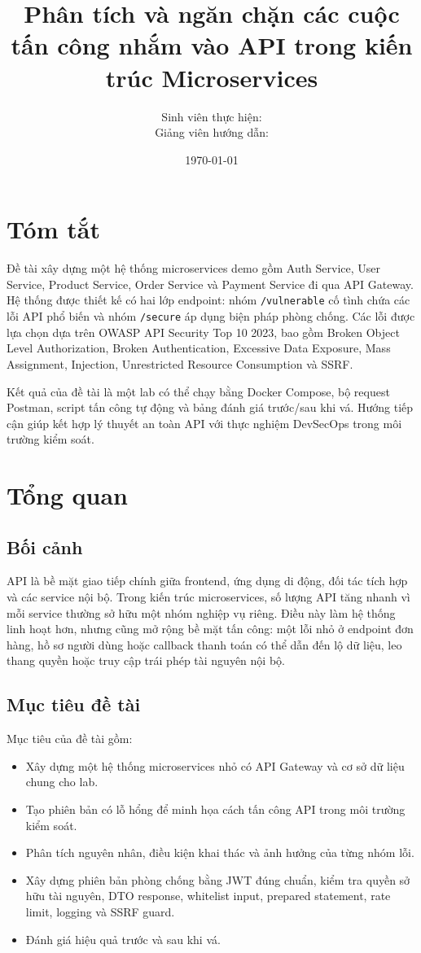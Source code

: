 \documentclass[12pt,a4paper]{report}
\title{\textbf{Phân tích và ngăn chặn các cuộc tấn công nhắm vào API trong kiến trúc Microservices}}
\author{Sinh viên thực hiện: \underline{\hspace{6cm}}\\Giảng viên hướng dẫn: \underline{\hspace{5.4cm}}}
\date{\today}
\begin{document}
\maketitle
\tableofcontents
\newpage

\chapter*{Tóm tắt}
Đề tài xây dựng một hệ thống microservices demo gồm Auth Service, User Service, Product Service, Order Service và Payment Service đi qua API Gateway. Hệ thống được thiết kế có hai lớp endpoint: nhóm \texttt{/vulnerable} cố tình chứa các lỗi API phổ biến và nhóm \texttt{/secure} áp dụng biện pháp phòng chống. Các lỗi được lựa chọn dựa trên OWASP API Security Top 10 2023, bao gồm Broken Object Level Authorization, Broken Authentication, Excessive Data Exposure, Mass Assignment, Injection, Unrestricted Resource Consumption và SSRF.

Kết quả của đề tài là một lab có thể chạy bằng Docker Compose, bộ request Postman, script tấn công tự động và bảng đánh giá trước/sau khi vá. Hướng tiếp cận giúp kết hợp lý thuyết an toàn API với thực nghiệm DevSecOps trong môi trường kiểm soát.

\chapter{Tổng quan}

\section{Bối cảnh}
API là bề mặt giao tiếp chính giữa frontend, ứng dụng di động, đối tác tích hợp và các service nội bộ. Trong kiến trúc microservices, số lượng API tăng nhanh vì mỗi service thường sở hữu một nhóm nghiệp vụ riêng. Điều này làm hệ thống linh hoạt hơn, nhưng cũng mở rộng bề mặt tấn công: một lỗi nhỏ ở endpoint đơn hàng, hồ sơ người dùng hoặc callback thanh toán có thể dẫn đến lộ dữ liệu, leo thang quyền hoặc truy cập trái phép tài nguyên nội bộ.

\section{Mục tiêu đề tài}
Mục tiêu của đề tài gồm:
\begin{itemize}
  \item Xây dựng một hệ thống microservices nhỏ có API Gateway và cơ sở dữ liệu chung cho lab.
  \item Tạo phiên bản có lỗ hổng để minh họa cách tấn công API trong môi trường kiểm soát.
  \item Phân tích nguyên nhân, điều kiện khai thác và ảnh hưởng của từng nhóm lỗi.
  \item Xây dựng phiên bản phòng chống bằng JWT đúng chuẩn, kiểm tra quyền sở hữu tài nguyên, DTO response, whitelist input, prepared statement, rate limit, logging và SSRF guard.
  \item Đánh giá hiệu quả trước và sau khi vá.
\end{itemize}
\end{document}
